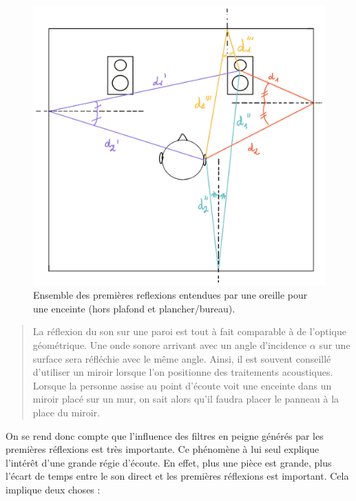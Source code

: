 \documentclass[
]{book}
\begin{document}
\begin{figure}

{\centering \includegraphics{_resources/drawings/roomPr} 

}

\caption{Ensemble des premières reflexions entendues par une oreille pour une enceinte (hors plafond et plancher/bureau).}\label{fig:unnamed-chunk-13}
\end{figure}

\begin{quote}
La réflexion du son sur une paroi est tout à fait comparable à de l'optique géométrique. Une onde sonore arrivant avec un angle d'incidence \(\alpha\) sur une surface sera réfléchie avec le même angle. Ainsi, il est souvent conseillé d'utiliser un miroir lorsque l'on positionne des traitements acoustiques. Lorsque la personne assise au point d'écoute voit une enceinte dans un miroir placé sur un mur, on sait alors qu'il faudra placer le panneau à la place du miroir.
\end{quote}

On se rend donc compte que l'influence des filtres en peigne générés par les premières réflexions est très importante. Ce phénomène à lui seul explique l'intérêt d'une grande régie d'écoute. En effet, plus une pièce est grande, plus l'écart de temps entre le son direct et les premières réflexions est important. Cela implique deux choses :
\end{document}
